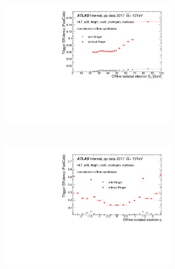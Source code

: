 \begin{figure}[h!tb]
  \begin{center}
  \begin{subfigure}[c]{.58\textwidth}
  \centering
  \includegraphics[width=\textwidth]{sections/04_operation/figures/efficiencies/eff_EGAM7_e28_ringer_and_noringer_2017_after_ts1_L2Calo_et.pdf}
  \caption{}
  \end{subfigure}\\
  \begin{subfigure}[c]{.58\textwidth}
  \centering
  \includegraphics[width=\textwidth]{sections/04_operation/figures/efficiencies/eff_EGAM7_e28_ringer_and_noringer_2017_after_ts1_L2Calo_eta.pdf}

\end{subfigure}
\end{center}
\end{figure}
